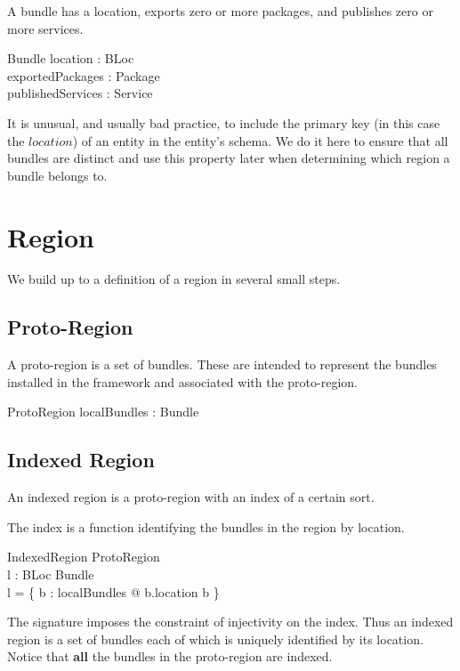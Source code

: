 \documentclass[a4paper,9pt]{article}
\begin{document}
A bundle has a location, exports zero or more packages, and publishes zero or more services.
\begin{schema}{Bundle}
  location : BLoc \\
  exportedPackages : \power Package \\
  publishedServices : \power Service \\
\end{schema}
It is unusual, and usually bad practice, to include the primary key (in this case the $location$) of
an entity in the entity's schema.
We do it here to ensure that all bundles are
distinct and use this property later when determining which region a bundle belongs to.

\clearpage
\section{Region}
\label{cha:region}

We build up to a definition of a region in several small steps.

\subsection{Proto-Region}

A proto-region is a set of bundles.
These are intended to represent the bundles installed in the framework and associated with the proto-region.
\begin{schema}{ProtoRegion}
  localBundles : \power Bundle \\
\end{schema}

\subsection{Indexed Region}

An indexed region is a proto-region with an index of a certain sort.

The index is a function identifying the bundles in the region by location.
\begin{schema}{IndexedRegion}
  ProtoRegion \\
  l : BLoc \pinj Bundle \\
\where
  l = \{ b : localBundles @ b.location \mapsto b \} \\
\end{schema}
The signature imposes the constraint of injectivity on the index.
Thus an indexed region is a set of bundles each of which is uniquely identified
by its location.
Notice that \textbf{all} the bundles in the proto-region are indexed.
\end{document}
